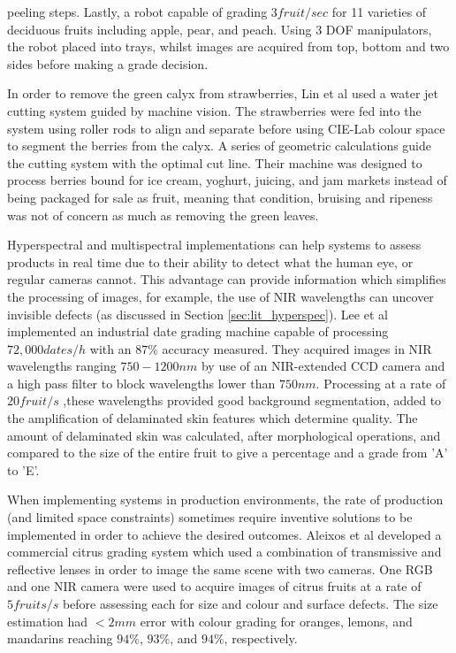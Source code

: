 \documentclass[fleqn,twoside,12pt]{report}
\begin{document}
peeling steps. Lastly, a robot capable of grading $3 fruit/sec$ for 11 varieties of deciduous fruits including apple, pear, and peach. Using 3 DOF manipulators, the robot placed into trays, whilst images are acquired from top, bottom and two sides before making a grade decision. 


In order to remove the green calyx from strawberries, Lin et al \cite{lin} used a water jet cutting system guided by machine vision. The strawberries were fed into the system using roller rods to align and separate before using CIE-Lab colour space to segment the berries from the calyx. A series of geometric calculations guide the cutting system with the optimal cut line. Their machine was designed to process berries bound for ice cream, yoghurt, juicing, and jam markets instead of being packaged for sale as fruit, meaning that condition, bruising and ripeness was not of concern as much as removing the green leaves.

Hyperspectral and multispectral implementations can help systems to assess products in real time due to their ability to detect what the human eye, or regular cameras cannot. This advantage can provide information which simplifies the processing of images, for example, the use of NIR wavelengths can uncover invisible defects (as discussed in Section \ref{sec:lit_hyperspec}). Lee et al \cite{lee} implemented an industrial date grading machine capable of processing $72,000 dates/h$ with an $87\%$ accuracy measured. They acquired images in NIR wavelengths ranging $750-1200nm$ by use of an NIR-extended CCD camera and a high pass filter to block wavelengths lower than $750nm$. Processing at a rate of $20 fruit/s$ ,these wavelengths provided good background segmentation, added to the amplification of delaminated skin features which determine quality. The amount of delaminated skin was calculated, after morphological operations, and compared to the size of the entire fruit to give a percentage and a grade from 'A' to 'E'. 

When implementing systems in production environments, the rate of production (and limited space constraints) sometimes require inventive solutions to be implemented in order to achieve the desired outcomes. Aleixos et al \cite{aleixos} developed a commercial citrus grading system which used a combination of transmissive and reflective lenses in order to image the same scene with two cameras. One RGB and one NIR camera were used to acquire images of citrus fruits at a rate of $5 fruits/s$ before assessing each for size and colour and surface defects. The size estimation had $<2mm$ error with colour grading for oranges, lemons, and mandarins reaching $94\%$, $93\%$, and $94\%$, respectively.
\end{document}
